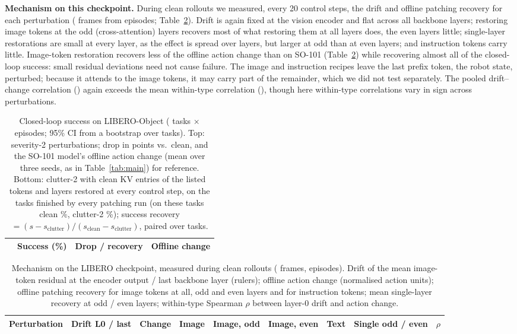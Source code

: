 \documentclass[conference]{IEEEtran}
\begin{document}
\textbf{Mechanism on this checkpoint.} During clean rollouts we measured, every 20 control steps, the drift and offline patching recovery for each perturbation (\LmFrames{} frames from \LmEpisodes{} episodes; Table~\ref{tab:liberomech}). Drift is again fixed at the vision encoder and flat across all \LmLayers{} backbone layers; restoring image tokens at the odd (cross-attention) layers recovers most of what restoring them at all layers does, the even layers little; single-layer restorations are small at every layer, as the effect is spread over \LmLayers{} layers, but larger at odd than at even layers; and instruction tokens carry little. Image-token restoration recovers less of the offline action change than on SO-101 (Table~\ref{tab:liberomech}) while recovering almost all of the closed-loop success: small residual deviations need not cause failure. The image and instruction recipes leave the last prefix token, the robot state, perturbed; because it attends to the image tokens, it may carry part of the remainder, which we did not test separately. The pooled drift--change correlation (\LmPooled{}) again exceeds the mean within-type correlation (\LmWithin{}), though here within-type correlations vary in sign across perturbations.

\begin{table}[t]
\centering\small
\caption{Closed-loop success on LIBERO-Object (\LbTasks{} tasks $\times$ \LbEps{} episodes; 95\% CI from a bootstrap over tasks). Top: severity-2 perturbations; drop in points vs.\ clean, and the SO-101 model's offline action change (mean over three seeds, as in Table~\ref{tab:main}) for reference. Bottom: clutter-2 with clean KV entries of the listed tokens and layers restored at every control step, on the \PTasks{} tasks finished by every patching run (on these tasks clean \PClean\%, clutter-2 \PClutter\%); success recovery $=(s-s_\text{clutter})/(s_\text{clean}-s_\text{clutter})$, paired over tasks.}
\label{tab:libero}
\footnotesize
\setlength{\tabcolsep}{1.8pt}
\begin{tabular}{lccc}
\toprule
 & Success (\%) & Drop / recovery & Offline change \\
\midrule

\end{tabular}
\end{table}

\begin{table}[t]
\centering\small
\caption{Mechanism on the LIBERO checkpoint, measured during clean rollouts (\LmFrames{} frames, \LmEpisodes{} episodes). Drift of the mean image-token residual at the encoder output / last backbone layer (rulers); offline action change (normalised action units); offline patching recovery for image tokens at all, odd and even layers and for instruction tokens; mean single-layer recovery at odd / even layers; within-type Spearman $\rho$ between layer-0 drift and action change.}
\label{tab:liberomech}
\begin{tabular}{lcccccccc}
\toprule
Perturbation & Drift L0 / last & Change & Image & Image, odd & Image, even & Text & Single odd / even & $\rho$ \\
\midrule

\end{tabular}
\end{table}
\end{document}

